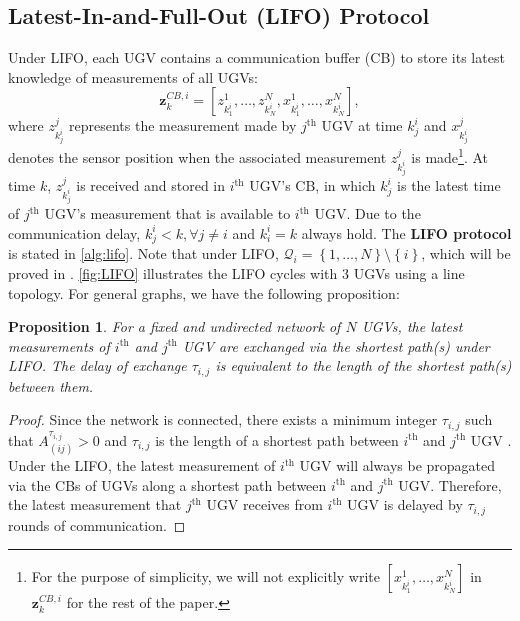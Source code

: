 \documentclass[journal]{IEEEtranTIE}
\newtheorem{prop}{\bfseries Proposition}
\theoremstyle{remark}
\begin{document}
	\subsection{Latest-In-and-Full-Out (LIFO) Protocol}\label{subsec:LIFO}
	Under LIFO, each UGV contains a communication buffer (CB) to store its latest knowledge of measurements of all UGVs: 
	\begin{equation*}
		\mathbf{z}^{CB,i}_k=\left[ z^1_{k^i_1},\dots,z^N_{k^i_N},x^1_{k^i_1},\dots,x^N_{k^i_N}\right],
	\end{equation*}
	where $z^j_{k^i_j}$ represents the measurement made by ${j^\text{th}}$ UGV at time $k^i_j$ and $x^j_{k^i_j}$ denotes the sensor position when the associated measurement $z^j_{k^i_j}$ is made\footnote{ 
		For the purpose of simplicity, we will not explicitly write $\left[x^1_{k^i_1},\dots,x^N_{k^i_N}\right]$ in $\mathbf{z}^{CB,i}_k$ for the rest of the paper.}.
	At time $k$, $z^j_{k^i_j}$ is received and stored in ${i^\text{th}}$ UGV's CB, in which $k^i_j$ is the latest time of ${j^\text{th}}$ UGV's measurement that is available to ${i^\text{th}}$ UGV. Due to the communication delay, $k^i_j<k, \forall j\neq i$ and $k^i_i=k$ always hold.
	The \textbf{LIFO protocol} is stated in \cref{alg:lifo}.
	Note that under LIFO, $\mathcal{Q}_i=\left\lbrace 1,\dots,N\right\rbrace \setminus \left\lbrace i\right\rbrace$, which will be proved in .
	\cref{fig:LIFO} illustrates the LIFO cycles with 3 UGVs using a line topology.  
	For general graphs, we have the following proposition:
	\medskip
	\begin{prop}\label{prop1}
		For a fixed and undirected network of $N$ UGVs, the latest measurements of $i^\text{th}$ and $j^\text{th}$ UGV are exchanged via the shortest path(s) under LIFO. The delay of exchange $\tau_{i,j}$ is equivalent to the length of the shortest path(s) between them.
	\end{prop}
	
	\begin{proof}
		Since the network is connected, there exists a minimum integer $\tau_{i,j}$ such that $A^{\tau_{i,j}}_{(ij)}>0$ and $\tau_{i,j}$ is the length of a shortest path between $i^\text{th}$ and $j^\text{th}$ UGV \cite{deo2016graph}. Under the LIFO, the latest measurement of $i^\text{th}$ UGV will always be propagated via the CBs of UGVs along a shortest path between $i^\text{th}$ and $j^\text{th}$ UGV. 
		Therefore, the latest measurement that $j^\text{th}$ UGV receives from $i^\text{th}$ UGV is delayed by $\tau_{i,j}$ rounds of communication.
	\end{proof}
	
\end{document}
